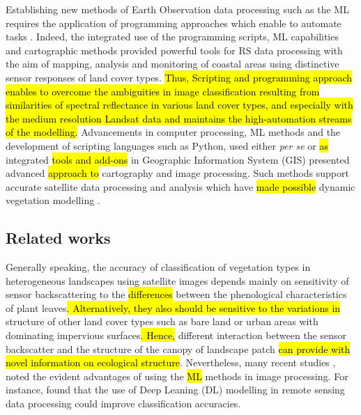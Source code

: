 \documentclass[coasts,article,submit,pdftex,moreauthors]{Definitions/mdpi}
\begin{document}
Establishing new methods of Earth Observation data processing such as the ML requires the application of programming approaches which enable to automate tasks \cite{MULLISSA2023113799,Lemenkova202206}. Indeed, the integrated use of the programming scripts, ML capabilities and cartographic methods provided powerful tools for RS data processing with the aim of mapping, analysis and monitoring of coastal areas using distinctive sensor responses of land cover types. \hl{Thus, Scripting and programming approach enables to overcome the ambiguities in image classification resulting from similarities of spectral reflectance in various land cover types, and especially with the medium resolution Landsat data and maintains the high-automation streams of the modelling.} Advancements in computer processing, ML methods and the development of scripting languages such as Python, used either \emph{per se} or \hl{as }integrated \hl{tools and add-ons }in Geographic Information System (GIS) presented advanced \hl{approach to} cartography and image processing. Such methods support accurate satellite data processing and analysis which have \hl{made possible} dynamic vegetation modelling \cite{Lemenkova202227}. 

\subsection{Related works}
Generally speaking, the accuracy of classification of vegetation types in heterogeneous landscapes using satellite images depends mainly on sensitivity of sensor backscattering to the \hl{differences} between the phenological characteristics of plant leaves\hl{. Alternatively, they also should be sensitive to the variations in} structure of other land cover types\hl{ }such as bare land or urban areas with dominating impervious surfaces\hl{. Hence, }different interaction between the sensor backscatter and the structure of the canopy of landscape patch \hl{can provide with novel information on ecological structure}. Nevertheless, many recent studies \cite{rs15235559,WU2023103407,CHEN2023101499,rs15225387,LIN2021102370}, noted the evident advantages of using the \hl{ML} methods in image processing. For instance, \cite{LIAO2023110231} found that the use of Deep Leaning (DL) modelling in remote sensing data processing could improve classification accuracies. 
\end{document}
